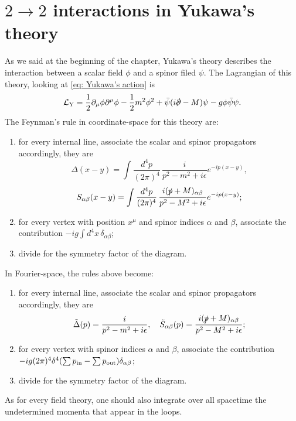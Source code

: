 \section{\texorpdfstring{$2 \to 2$}{2 in 2} interactions in Yukawa's theory}
As we said at the beginning of the chapter, Yukawa's theory describes the interaction between a scalar field $\phi$ and a spinor filed $\psi$. The Lagrangian of this theory, looking at \eqref{eq: Yukawa's action} is 
\begin{equation}
\label{eq: Yukawa's Lagrangian}
    \Lag_{\rem{Y}} = \frac{1}{2}\p_\mu\phi\p^\mu\phi - \frac{1}{2}m^2\phi^2 + \b{\psi}(i\sl{\p} - M)\psi - g\phi\b{\psi}\psi.
\end{equation}
The Feynman's rule in coordinate-space for this theory are:
\begin{enumerate}
    \item for every internal line, associate the scalar and spinor propagators accordingly, they are
    \begin{equation}
        \Delta(x - y) = \int \frac{d^4p}{(2\pi)^4}\,\frac{i}{p^2 - m^2 + i\epsilon}e^{-ip(x - y)},
    \end{equation}
    \begin{equation}
        S_{\alpha\beta}(x - y) = \int \frac{d^4p}{(2\pi)^4}\,\frac{i(\sl{p} + M)_{\alpha\beta}}{p^2 - M^2 + i\epsilon}e^{-ip(x - y)};
    \end{equation}
    \item for every vertex with position $x^\mu$ and spinor indices $\alpha$ and $\beta$, associate the contribution $-ig\int d^4x\,\delta_{\alpha\beta}$;
    \item divide for the symmetry factor of the diagram.
\end{enumerate}
In Fourier-space, the rules above become:
\begin{enumerate}
    \item for every internal line, associate the scalar and spinor propagators accordingly, they are
    \begin{equation}
        \t{\Delta}(p) = \frac{i}{p^2 - m^2 + i\epsilon},\quad \t{S}_{\alpha\beta}(p) = \frac{i(\sl{p} + M)_{\alpha\beta}}{p^2 - M^2 + i\epsilon};
    \end{equation}
    \item for every vertex with spinor indices $\alpha$ and $\beta$, associate the contribution $-ig(2\pi)^4\delta^4(\sum p_{\rem{in}} - \sum p_{\rem{out}})\delta_{\alpha\beta}$;
    \item divide for the symmetry factor of the diagram.
\end{enumerate}
As for every field theory, one should also integrate over all spacetime the undetermined momenta that appear in the loops. 

